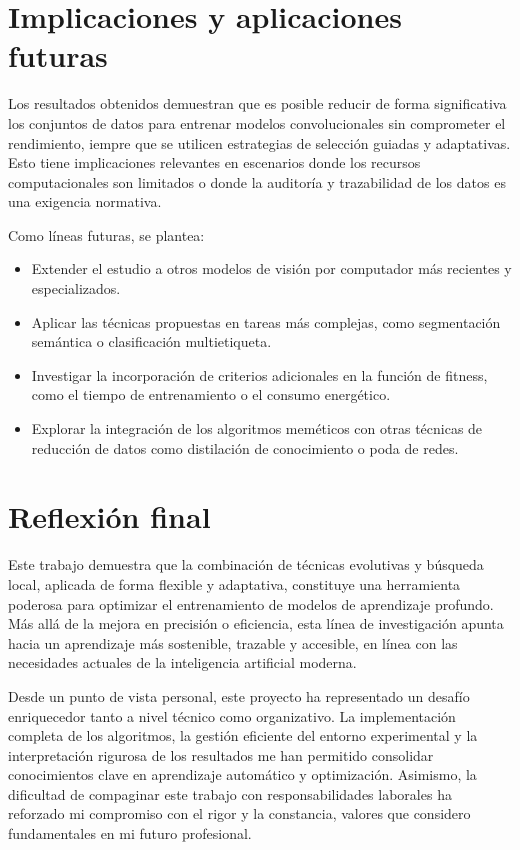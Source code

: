 \section{Implicaciones y aplicaciones futuras}\label{sec:implicaciones-aplicaciones}
Los resultados obtenidos demuestran que es posible reducir de forma significativa los conjuntos de datos para entrenar modelos convolucionales sin comprometer el rendimiento,
iempre que se utilicen estrategias de selección guiadas y adaptativas.
Esto tiene implicaciones relevantes en escenarios donde los recursos computacionales son limitados o donde la auditoría y trazabilidad de los datos es una exigencia normativa.

Como líneas futuras, se plantea:
\begin{itemize}
    \item Extender el estudio a otros modelos de visión por computador más recientes y especializados.
    \item Aplicar las técnicas propuestas en tareas más complejas, como segmentación semántica o clasificación multietiqueta.
    \item Investigar la incorporación de criterios adicionales en la función de fitness, como el tiempo de entrenamiento o el consumo energético.
    \item Explorar la integración de los algoritmos meméticos con otras técnicas de reducción de datos como distilación de conocimiento o poda de redes.
\end{itemize}


\section{Reflexión final}\label{sec:reflexion-final}
Este trabajo demuestra que la combinación de técnicas evolutivas y búsqueda local, aplicada de forma flexible y adaptativa,
constituye una herramienta poderosa para optimizar el entrenamiento de modelos de aprendizaje profundo.
Más allá de la mejora en precisión o eficiencia, esta línea de investigación apunta hacia un aprendizaje más sostenible, trazable y accesible,
en línea con las necesidades actuales de la inteligencia artificial moderna.

Desde un punto de vista personal, este proyecto ha representado un desafío enriquecedor tanto a nivel técnico como organizativo.
La implementación completa de los algoritmos, la gestión eficiente del entorno experimental y
la interpretación rigurosa de los resultados me han permitido consolidar conocimientos clave en aprendizaje automático y optimización.
Asimismo, la dificultad de compaginar este trabajo con responsabilidades laborales ha reforzado mi compromiso con el rigor y la constancia,
valores que considero fundamentales en mi futuro profesional.